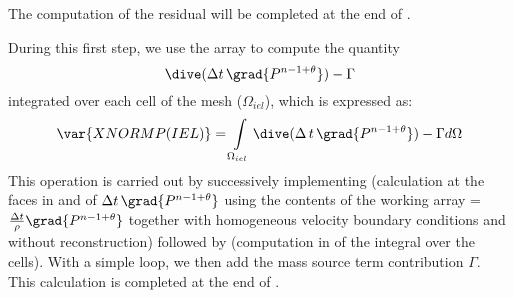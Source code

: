The computation of the residual will be completed at the end of .



During this first step, we use the array  to compute the quantity $$\dive(\Delta t \,\grad{P^{n-1+\theta}})-\Gamma$$ integrated over each cell  of the mesh ($\Omega_{iel}$), which is expressed as:
$$\var{XNORMP(IEL)}=\int\limits_{\Omega_{iel}}{\dive(\Delta\,t\,\grad{P^{n-1+\theta}})-\Gamma
d\Omega}$$
This operation is carried out by successively implementing 
(calculation at the faces in  and  of $\Delta t\,\grad{P^{n-1+\theta}}$ using the contents of the working array =$\frac{\Delta t}{\rho} \grad{P^{n-1+\theta}}$ together with homogeneous velocity boundary conditions and without reconstruction) followed by  (computation in  of the integral over the cells).  With a simple loop, we then add the mass source term contribution $\Gamma$.
This calculation is completed at the end of .\\


